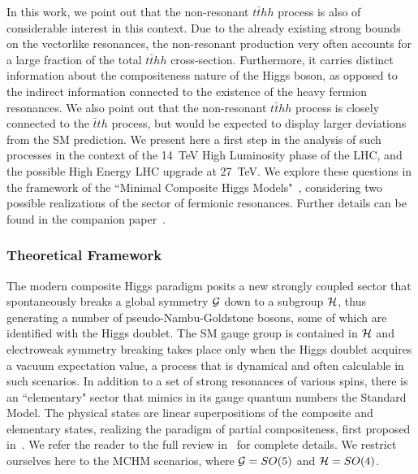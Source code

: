 In this work, we point out that the non-resonant ${t\bar t}hh$ process
is also of considerable interest in this context.  Due to the already
existing strong bounds on the vectorlike resonances, the non-resonant
production very often accounts for a large fraction of the total
${t\bar t}hh$ cross-section.  Furthermore, it carries distinct
information about the compositeness nature of the Higgs boson, as
opposed to the indirect information connected to the existence of the
heavy fermion resonances.  We also point out that the non-resonant
${t\bar t}hh$ process is closely connected to the ${\bar t}th$
process, but would be expected to display larger deviations from the
SM prediction.  We present here a first step in the analysis of such
processes in the context of the 14~TeV High Luminosity phase of the
LHC, and the possible High Energy LHC upgrade at 27~TeV. We explore
these questions in the framework of the ``Minimal Composite Higgs
Models"~\cite{Agashe:2004rs}, considering two possible
realizations of the sector of fermionic resonances.  Further details
can be found in the companion paper~\cite{MCHMtthh}.

\subsubsection{Theoretical Framework}
\label{MCHM}

The modern composite Higgs paradigm posits a new strongly coupled
sector that spontaneously breaks a global symmetry ${\cal G}$ down to
a subgroup ${\cal H}$, thus generating a number of
pseudo-Nambu-Goldstone bosons, some of which are identified
with the Higgs doublet.  The SM gauge group is contained in ${\cal H}$
and electroweak symmetry breaking takes place only when the Higgs
doublet acquires a vacuum expectation value, a process that is
dynamical and often calculable in such scenarios.  In addition to a
set of strong resonances of various spins, there is an ``elementary"
sector that mimics in its gauge quantum numbers the Standard Model.  The physical states are linear superpositions of the composite
and elementary states, realizing the paradigm of partial
compositeness, first proposed in~\cite{KAPLAN1991259}.  We refer the
reader to the full review in~\cite{Panico:2015jxa} for complete
details.  We restrict ourselves here to the MCHM scenarios, where
${\cal G} = SO(5)$ and ${\cal H} = SO(4)$.

